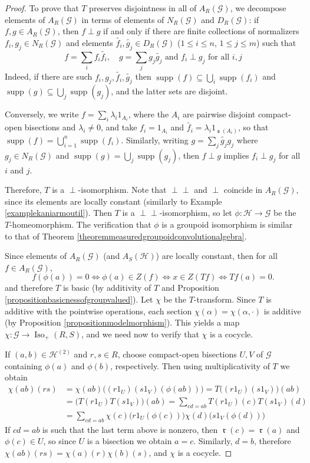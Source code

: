\documentclass[letter,11pt]{amsart}
\theoremstyle{plain}		\newtheorem{theorem}[generalnumbering]{Theorem}
\theoremstyle{plain}		\newtheorem{corollary}[generalnumbering]{Corollary}
\theoremstyle{definition}		\newtheorem{definition}[generalnumbering]{Definition}
\theoremstyle{definition}		\newtheorem{example}[generalnumbering]{Example}
\theoremstyle{plain}		\newtheorem{proposition}[generalnumbering]{Proposition}
\theoremstyle{plain}		\newtheorem{lemma}[generalnumbering]{Lemma}
\theoremstyle{plain}    \newtheorem{plainstyle}[generalnumbering]{\namefordifferentenvironment}
\theoremstyle{plain}    \newtheorem*{plainstyle*}{\namefordifferentenvironment}
\theoremstyle{definition}    \newtheorem{definitionstyle}[generalnumbering]{\namefordifferentenvironment}
\theoremstyle{definition}    \newtheorem*{definitionstyle*}{\namefordifferentenvironment}
\newcommand{\perpp}{\perp\!\!\!\perp}
\DeclareMathOperator{\supp}{supp}
\DeclareMathOperator{\so}{\mathfrak{s}}
\DeclareMathOperator{\ra}{\mathfrak{r}}
\begin{document}
\begin{proof}
	To prove that $T$ preserves disjointness in all of $A_R(\mathcal{G})$, we decompose elements of $A_R(\mathcal{G})$ in terms of elements of $N_R(\mathcal{G})$ and $D_R(\mathcal{G})$: if $f,g\in A_R(\mathcal{G})$, then $f\perp g$ if and only if there are finite collections of normalizers $f_i,g_j\in N_R(\mathcal{G})$ and elements $\widetilde{f_i},\widetilde{g_j}\in D_R(\mathcal{G})$ ($1\leq i\leq n$, $1\leq j\leq m$) such that
	\[f=\sum_i f_i\widetilde{f_i},\quad g=\sum_j g_j\widetilde{g_j}\text{ and }f_i\perp g_j\text{ for all }i,j\]
	Indeed, if there are such $f_i,g_j,\widetilde{f_i},\widetilde{g_j}$ then $\supp(f)\subseteq\bigcup_i\supp(f_i)$ and $\supp(g)\subseteq\bigcup_j\supp(g_j)$, and the latter sets are disjoint.
	
	Conversely, we write $f=\sum_i\lambda_i1_{A_i}$, where the $A_i$ are pairwise disjoint compact-open bisections and $\lambda_i\neq 0$, and take $f_i=1_{A_i}$ and $\widetilde{f_i}=\lambda_i1_{\so(A_i)}$, so that $\supp(f)=\bigcup_{i=1}^n\supp(f_i)$. Similarly, writing $g=\sum_j\widetilde{g_j}g_j$ where $g_j\in N_R(\mathcal{G})$ and $\supp(g)=\bigcup_j\supp(g_j)$, then $f\perp g$ implies $f_i\perp g_j$ for all $i$ and $j$.
	
	Therefore, $T$ is a $\perp$-isomorphism. Note that $\perpp$ and $\perp$ coincide in $A_R(\mathcal{G})$, since its elements are locally constant (similarly to Example \ref{examplekaniarmoutil}). Then $T$ is a $\perpp$-isomorphism, so let $\phi\colon\mathcal{H}\to\mathcal{G}$ be the $T$-homeomorphism. The verification that $\phi$ is a groupoid isomorphism is similar to that of Theorem \ref{theoremmeasuredgroupoidconvolutionalgebra}.
	
	Since elements of $A_R(\mathcal{G})$ (and $A_S(\mathcal{H})$) are locally constant, then for all $f\in A_R(\mathcal{G})$,
	\[f(\phi(a))=0\iff \phi(a)\in Z(f)\iff x\in Z(Tf)\iff Tf(a)=0.\]
	and therefore $T$ is basic (by additivity of $T$ and Proposition \ref{propositionbasicnessofgroupvalued}). Let $\chi$ be the $T$-transform. Since $T$ is additive with the pointwise operations, each section $\chi(\alpha)=\chi(\alpha,\cdot)$ is additive (by Proposition \ref{propositionmodelmorphism}). This yields a map $\chi\colon\mathcal{G}\to\operatorname{Iso}_+(R,S)$, and we need now to verify that $\chi$ is a cocycle.
	
	If $(a,b)\in\mathcal{H}^{(2)}$ and $r,s\in R$, choose compact-open bisections $U,V$ of $\mathcal{G}$ containing $\phi(a)$ and $\phi(b)$, respectively. Then using multiplicativity of $T$ we obtain
	\begin{align*}
	\chi(ab)(rs)&=\chi(ab)\big((r1_U)(s1_V)(\phi(ab))\big)=T\big((r1_U)(s1_V)\big)(ab)\\
	&=\big(T(r1_U)T(s1_V)\big)(ab)=\sum_{cd=ab}T(r1_U)(c)T(s1_V)(d)\\
	&=\sum_{cd=ab}\chi(c)\big(r1_U(\phi(c))\big)\chi(d)\big(s1_V(\phi(d))\big)
	\end{align*}
	If $cd=ab$ is such that the last term above is nonzero, then $\ra(c)=\ra(a)$ and $\phi(c)\in U$, so since $U$ is a bisection we obtain $a=c$. Similarly, $d=b$, therefore $\chi(ab)(rs)=\chi(a)(r)\chi(b)(s)$, and $\chi$ is a cocycle.
	

\end{proof}
\end{document}
